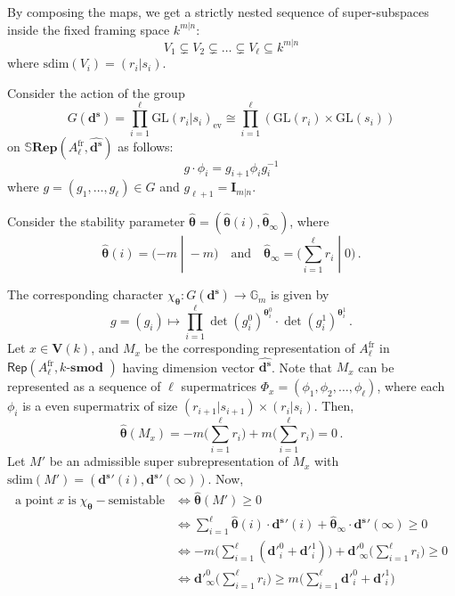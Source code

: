 \documentclass[12pt, reqno]{amsart}
\theoremstyle{plain}
\numberwithin{equation}{section}
\def \d{\mathbf{d}}
\def \sd{\mathbf{d^s}}
\def \ra{\rightarrow}
\def \bS{\mathbb{S}}
\def \bfR{\mathbf{Rep}}
\def \btheta{\boldsymbol{\theta}}
\newcommand{\sdim}{\mathrm{sdim}}
\newcommand{\smod} {k\text{-}\textbf{smod }}
\begin{document}
By composing the maps, we get a strictly nested sequence of super-subspaces inside the fixed framing space $k^{m|n}$:
\[ V_1 \subsetneq V_2 \subsetneq \dots \subsetneq V_\ell \subseteq k^{m|n} \]
where $\sdim(V_i) = (r_i|s_i)$. 

Consider the action of the group 
\[ G(\sd) = \prod_{i=1}^\ell \text{GL}(r_i|s_i)_{\text{ev}} \cong \prod_{i=1}^\ell (\text{GL}(r_i) \times \text{GL}(s_i)) \]
on $\bS\bfR(A_\ell^{\mathrm{fr}}, \hat{\sd})$ as follows:
\[ g \cdot \phi_i = g_{i+1} \phi_i g_i^{-1} \]
where $g = (g_1, \dots, g_\ell) \in G$ and $g_{\ell+1} = \mathbf{I}_{m|n}$.

Consider the stability parameter $\hat{\btheta} = (\hat{\btheta}(i), \hat{\btheta}_\infty)$, where 
$$\hat{\btheta}(i) = (-m\;|\;-m) \quad \text{and} \quad \hat{\btheta}_\infty = \big(\sum_{i = 1}^\ell r_i\;|\;0\big)\,.$$

The corresponding character $\chi_{\btheta} \colon G(\sd) \ra \mathbb{G}_m$ is given by 
$$
g = (g_i) \mapsto \prod_{i=1}^\ell \det(g_i^0)^{\btheta_i^0}\cdot \det(g_i^1)^{\btheta_i^1}\,.
$$
Let $x\in \mathbf{V}(k)$, and $M_x$ be the corresponding representation of $A_\ell^\mathrm{fr}$ in $\mathsf{Rep}(A_\ell^\mathrm{fr}, \smod)$
having dimension vector $\hat{\sd}$. Note that $M_x$ can be represented as a sequence of $\ell$ supermatrices $\Phi_x = (\phi_1, \phi_2, \dots, \phi_\ell)$, where each $\phi_i$ is a even supermatrix of size $(r_{i+1}|s_{i+1})\times (r_i|s_i)$.
Then,
$$
\hat{\btheta}(M_x) = -m\big(\sum_{i=1}^\ell r_i\big) + m\big(\sum_{i=1}^\ell r_i\big) = 0\,.
$$
Let $M'$ be an admissible super subrepresentation of $M_x$ with 
$\sdim(M')=(\sd'(i), \sd'(\infty))$.
Now, 
$$
\begin{aligned}
\mbox{a point}\; x \;\mbox{is}\; \chi_{\btheta}-\mathrm{semistable} & \iff \hat{\btheta}(M') \ge 0 \\
& \iff \sum_{i=1}^\ell \hat{\btheta}(i) \cdot \sd'(i) + \hat{\btheta}_\infty \cdot \sd'(\infty) \ge 0 \\
& \iff -m\Big(\sum_{i=1}^\ell (\d'^{0}_{i} + \d'^{1}_{i})\Big) + \d'^{0}_{\infty}\Big(\sum_{i=1}^\ell r_i\Big) \geq 0\\
& \iff \d'^{0}_{\infty}\Big(\sum_{i=1}^\ell r_i\Big) \ge m\Big(\sum_{i=1}^\ell \d'^{0}_{i} + \d'^{1}_{i}\Big)
\end{aligned}
$$ 
\end{document}
